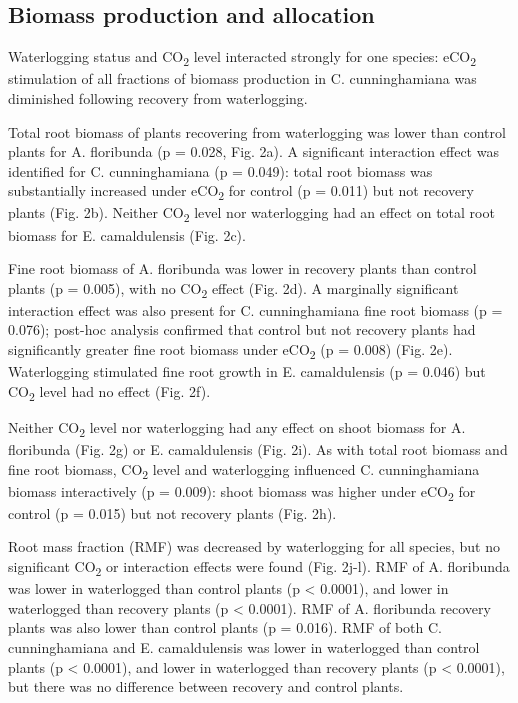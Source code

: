 \documentclass[12pt,a4paper]{memoir}
\begin{document}
\subsection*{Biomass production and allocation}
Waterlogging status and CO\textsubscript{2} level interacted strongly for one species: eCO\textsubscript{2} stimulation of all fractions of biomass production in C. cunninghamiana was diminished following recovery from waterlogging. 

Total root biomass of plants recovering from waterlogging was lower than control plants for A. floribunda (p = 0.028, Fig. 2a). A significant interaction effect was identified for C. cunninghamiana (p = 0.049): total root biomass was substantially increased under eCO\textsubscript{2} for control (p = 0.011) but not recovery plants (Fig. 2b). Neither CO\textsubscript{2} level nor waterlogging had an effect on total root biomass for E. camaldulensis (Fig. 2c). 

Fine root biomass of A. floribunda was lower in recovery plants than control plants (p = 0.005), with no CO\textsubscript{2} effect (Fig. 2d). A marginally significant interaction effect was also present for C. cunninghamiana fine root biomass (p = 0.076); post-hoc analysis confirmed that control but not recovery plants had significantly greater fine root biomass under eCO\textsubscript{2} (p = 0.008) (Fig. 2e). Waterlogging stimulated fine root growth in E. camaldulensis (p = 0.046) but CO\textsubscript{2} level had no effect (Fig. 2f).

Neither CO\textsubscript{2} level nor waterlogging had any effect on shoot biomass for A. floribunda (Fig. 2g) or E. camaldulensis (Fig. 2i). As with total root biomass and fine root biomass, CO\textsubscript{2} level and waterlogging influenced C. cunninghamiana biomass interactively (p = 0.009): shoot biomass was higher under eCO\textsubscript{2} for control (p = 0.015) but not recovery plants (Fig. 2h).

Root mass fraction (RMF) was decreased by waterlogging for all species, but no significant CO\textsubscript{2} or interaction effects were found (Fig. 2j-l). RMF of A. floribunda was lower in waterlogged than control plants (p < 0.0001), and lower in waterlogged than recovery plants (p < 0.0001). RMF of A. floribunda recovery plants was also lower than control plants (p = 0.016). RMF of both C. cunninghamiana and E. camaldulensis was lower in waterlogged than control plants (p < 0.0001), and lower in waterlogged than recovery plants (p < 0.0001), but there was no difference between recovery and control plants.
\end{document}
